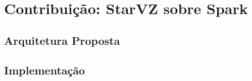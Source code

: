 \chapter{Contribuição: StarVZ sobre Spark} \label{ch:contribution}

\section{Arquitetura Proposta}

\section{Implementação}